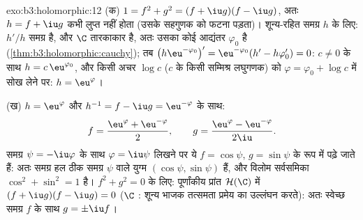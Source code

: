 \begin{solution}{exo:b3:holomorphic:12}
(क) $1 = f^2 + g^2 = (f + \iu g)(f - \iu g)$, अतः $h = f +
\iu g$ कभी लुप्त नहीं होता (उसके सहगुणक को फटना पड़ता)।
शून्य-रहित समग्र $h$ के लिए: $h'/h$ समग्र है, और $\C$ तारकाकार है,
अतः उसका कोई आद्यंतर $\varphi_0$ है (\cref{thm:b3:holomorphic:cauchy}); तब $\bigl(h\eu^{-\varphi_0}\bigr)' = \eu^{-\varphi_0}(h' -
h\varphi_0') = 0$: $c \neq 0$ के साथ $h = c\,\eu^{\varphi_0}$,
और किसी अचर $\log c$ ($c$ के किसी सम्मिश्र लघुगणक) को $\varphi = \varphi_0
+ \log c$ में सोख
लेने पर: $h =
\eu^{\varphi}$।

(ख) $h = \eu^{\varphi}$ और $h^{-1} = f - \iu g =
\eu^{-\varphi}$ के साथ:
\[
f = \frac{\eu^{\varphi} + \eu^{-\varphi}}2,
\qquad
g = \frac{\eu^{\varphi} - \eu^{-\varphi}}{2\iu} .
\]
समग्र $\psi = -\iu\varphi$ के साथ $\varphi = \iu\psi$ लिखने पर ये $f = \cos\psi$, $g = \sin\psi$ के रूप में पढ़े
जाते हैं: अतः समग्र हल ठीक समग्र $\psi$ वाले युग्म $(\cos\psi,
\sin\psi)$ हैं, और विलोम
सर्वसमिका $\cos^2 + \sin^2 = 1$ है। $f^2 + g^2 = 0$ के लिए: पूर्णांकीय प्रांत $\mathcal H(\C)$ में $(f + \iu g)(f - \iu g) = 0$
($\C$ : शून्य भाजक तत्समता प्रमेय का उल्लंघन करते): अतः स्वेच्छ
समग्र $f$ के साथ $g = \pm\iu
f$।
\end{solution}

